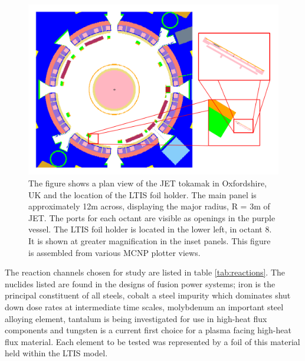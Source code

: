 \begin{figure}[H]
  \centering
  \includegraphics[width=\linewidth]{jet_mcnp_inset}
  \caption[Toroidal slice of JET MCNP geometry, inset showing LTIS foil holder.]{The figure shows a plan view of the JET tokamak in Oxfordshire, UK and the location of the LTIS foil holder. The main panel is approximately 12m across, displaying the major radius, R = 3m of JET. The ports for each octant are visible as openings in the purple vessel. The LTIS foil holder is located in the lower left, in octant 8. It is shown at greater magnification in the inset panels. This figure is assembled from various MCNP plotter views.}
  \label{fig:jet_mcnp}
\end{figure}

The reaction channels chosen for study are listed in table \ref{tab:reactions}. The nuclides listed are found in the designs of fusion power systems; iron is the principal constituent of all steels, cobalt a steel impurity which dominates shut down dose rates at intermediate time scales, molybdenum an important steel alloying element, tantalum is being investigated for use in high-heat flux components and tungsten is a current first choice for a plasma facing high-heat flux material. Each element to be tested was represented by a foil of this material held within the LTIS model.


